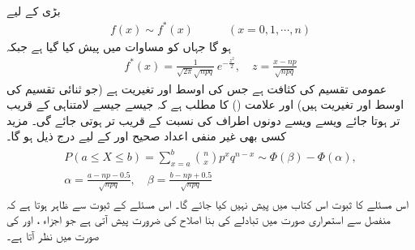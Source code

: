 \quad {}\\
بڑی  کے لیے
\begin{align*}
f(x)\sim f^*(x)\quad\quad\quad (x=0,1,\cdots,n)
\end{align*}
ہو گا جہاں  کو مساوات  میں پیش کیا گیا ہے جبکہ
\begin{align}\label{مساوات_شماریات_ڈی_موے_الف}
f^*(x)=\frac{1}{\sqrt{2\pi}\sqrt{npq}}\,e^{-\frac{z^2}{2}},\quad z=\frac{x-np}{\sqrt{npq}}
\end{align}
عمومی تقسیم کی کثافت ہے جس کی اوسط  اور تغیریت  ہے (جو ثنائی تقسیم کی اوسط اور تغیریت ہیں) اور علامت  () کا مطلب ہے کہ جیسے جیسے  لامتناہی کے قریب تر ہوتا جائے  ویسے ویسے دونوں اطراف کی نسبت  کے قریب تر ہوتی جائے گی۔ مزید کسی بھی غیر منفی اعداد صحیح  اور  کے لیے درج ذیل ہو گا۔
\begin{gather}
\begin{aligned}\label{مساوات_شماریات_ڈی_موے_ب}
P(a\le X\le b)=\sum_{x=a}^{b}\binom{n}{x}p^xq^{n-x}\sim \Phi(\beta)-\Phi(\alpha),\\
\alpha=\frac{a-np-0.5}{\sqrt{npq}},\quad \beta=\frac{b-np+0.5}{\sqrt{npq}}
\end{aligned}
\end{gather}
اس مسئلے کا ثبوت اس کتاب میں پیش نہیں کیا جائے گا۔ اس مسئلے کے ثبوت  سے ظاہر ہوتا ہے کہ منفصل سے استمراری صورت میں تبادلے کی بنا اصلاح کی ضرورت پیش آتی ہے جو اجزاء ،  اور  کی صورت میں نظر آتا ہے۔

